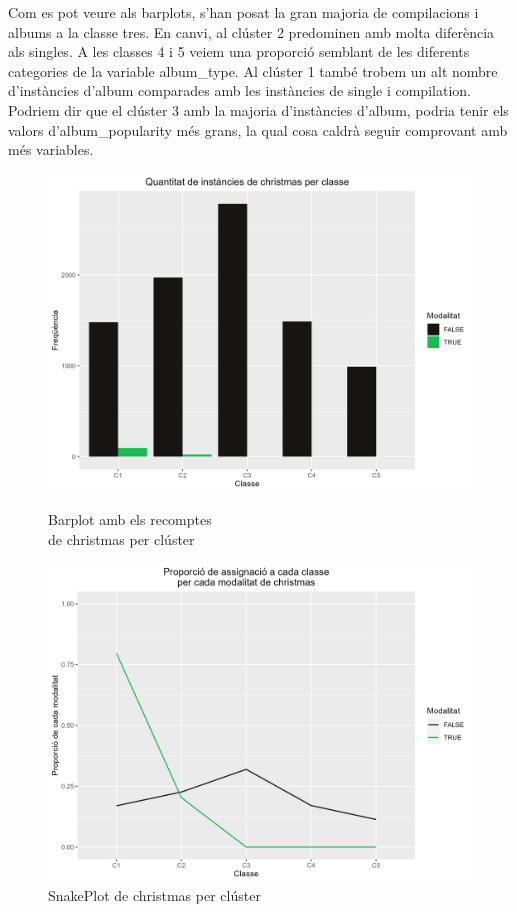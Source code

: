 Com es pot veure als barplots, s'han posat la gran majoria de compilacions i albums a la classe tres. En canvi, al clúster 2 predominen amb molta diferència als singles. A les classes 4 i 5 veiem una proporció semblant de les diferents categories de la variable album\_type. Al clúster 1 també trobem un alt nombre d'instàncies d'album comparades amb les instàncies de single i compilation. Podriem dir que el clúster 3 amb la majoria d'instàncies d'album, podria tenir els valors d'album\_popularity més grans, la qual cosa caldrà seguir comprovant amb més variables. 

\begin{figure}[H]
\centering
    \begin{minipage}{.49\textwidth}
        \centering
        \includegraphics[width=0.95\linewidth]{Images/5_Profiling/categoriques/cat/Cat_BarPlot_christmas.png}
        \caption{Barplot amb els recomptes \\ de christmas per clúster}
        \label{fig:Cat_BarPlot_christmas}
    \end{minipage}%
    \begin{minipage}{.49\textwidth}
        \centering
        \includegraphics[width=0.95\linewidth]{Images/5_Profiling/categoriques/cat/Cat_SnakePlot_christmas.png}
        \caption{SnakePlot de christmas per clúster}
        \label{fig:Cat_SnakePlot_christmas}
    \end{minipage}%
\end{figure}

